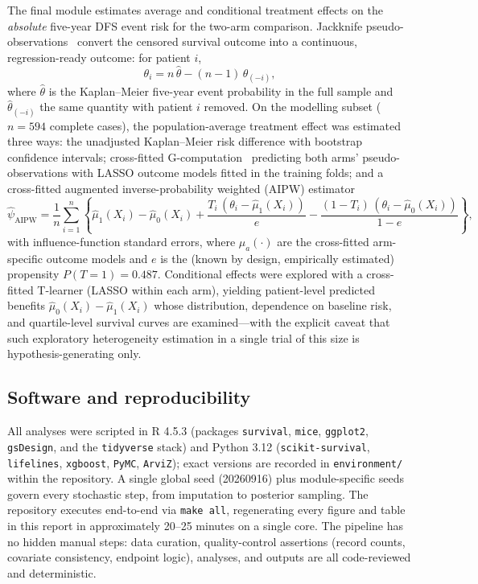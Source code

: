 The final module estimates average and conditional treatment effects on
the \emph{absolute} five-year DFS event risk for the two-arm comparison.
Jackknife pseudo-observations~\cite{andersen2003,parner2010} convert the
censored survival outcome into a continuous, regression-ready outcome:
for patient $i$,
\begin{equation}
\theta_i = n\,\hat\theta - (n-1)\,\hat\theta_{(-i)},
\end{equation}
where $\hat\theta$ is the Kaplan--Meier five-year event probability in
the full sample and $\hat\theta_{(-i)}$ the same quantity with patient
$i$ removed. On the modelling subset ($n = 594$ complete cases), the
population-average treatment effect was estimated three ways: the
unadjusted Kaplan--Meier risk difference with bootstrap confidence
intervals; cross-fitted G-computation~\cite{hernan2020} predicting both
arms' pseudo-observations with LASSO outcome models fitted in the
training folds; and a cross-fitted augmented inverse-probability
weighted (AIPW) estimator
\begin{equation}
\hat\psi_{\mathrm{AIPW}} = \frac{1}{n}\sum_{i=1}^{n}
\left\{\hat\mu_1(X_i) - \hat\mu_0(X_i)
+ \frac{T_i\,(\theta_i - \hat\mu_1(X_i))}{e}
- \frac{(1-T_i)\,(\theta_i - \hat\mu_0(X_i))}{1-e}\right\},
\label{eq:aipw}
\end{equation}
with influence-function standard errors, where
$\hat\mu_a(\cdot)$ are the cross-fitted arm-specific outcome models and
$e$ is the (known by design, empirically estimated) propensity
$P(T=1)=0.487$. Conditional effects were explored with a cross-fitted
T-learner (LASSO within each arm), yielding patient-level predicted
benefits $\hat\mu_0(X_i) - \hat\mu_1(X_i)$ whose distribution,
dependence on baseline risk, and quartile-level survival curves are
examined---with the explicit caveat that such exploratory
heterogeneity estimation in a single trial of this size is
hypothesis-generating only.

\subsection{Software and reproducibility}\label{sec:software}

All analyses were scripted in R 4.5.3 (packages \texttt{survival},
\texttt{mice}, \texttt{ggplot2}, \texttt{gsDesign}, and the
\texttt{tidyverse} stack) and Python 3.12 (\texttt{scikit-survival},
\texttt{lifelines}, \texttt{xgboost}, \texttt{PyMC}, \texttt{ArviZ});
exact versions are recorded in \texttt{environment/} within the
repository. A single global seed (20260916) plus module-specific seeds
govern every stochastic step, from imputation to posterior sampling.
The repository executes end-to-end via \texttt{make all}, regenerating
every figure and table in this report in approximately 20--25 minutes on
a single core. The pipeline has no hidden manual steps: data curation,
quality-control assertions (record counts, covariate consistency,
endpoint logic), analyses, and outputs are all code-reviewed and
deterministic.
